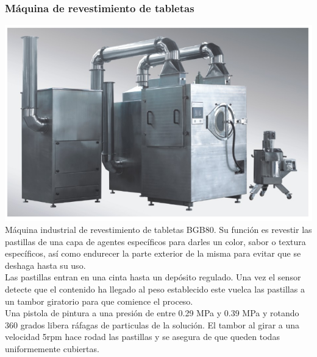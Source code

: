 	\newpage


	\subsubsection{Máquina de revestimiento de tabletas}
		
	\includegraphics[scale=0.5]{Datasheets/4Foto.png}\\
	
	Máquina industrial de revestimiento de tabletas BGB80. Su función es revestir las pastillas de una capa de agentes específicos para darles un color, sabor o textura específicos, así como endurecer la parte exterior de la misma para evitar que se deshaga hasta su uso.\\

	Las pastillas entran en una cinta hasta un depósito regulado. Una vez el sensor detecte que el contenido ha llegado al peso establecido este vuelca las pastillas a un tambor giratorio para que comience el proceso.\\

	Una pistola de pintura a una presión de entre 0.29 MPa y 0.39 MPa y rotando 360 grados libera ráfagas de particulas de la solución. El tambor al girar a una velocidad 5rpm hace rodad las pastillas y se asegura de que queden todas uniformemente cubiertas.\\

